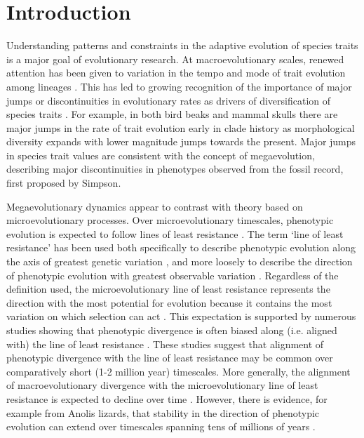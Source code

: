 \documentclass[12pt,letterpaper]{article}
\begin{document}
\section{Introduction}

Understanding patterns and constraints in the adaptive evolution of species traits is a major goal of evolutionary research. At macroevolutionary scales, renewed attention has been given to variation in the tempo and mode of trait evolution among lineages \cite{venditti2011multiple, khabbazian2016fast, castiglione2018, hansen2022, larouche2022mosaic, pagel2022general, navalon2022environmental, basu2023tempo}.
This has led to growing recognition of the importance of major jumps or discontinuities in evolutionary rates as drivers of diversification of species traits \cite{cooney2017mega, smaers2021evolution, goswami2022}.
For example, in both bird beaks and mammal skulls there are major jumps in the rate of trait evolution early in clade history as morphological diversity expands \cite{cooney2017mega, goswami2022} with lower magnitude jumps towards the present.
Major jumps in species trait values are consistent with the concept of megaevolution, describing major discontinuities in phenotypes observed from the fossil record, first proposed by Simpson.

Megaevolutionary dynamics appear to contrast with theory based on microevolutionary processes.
Over microevolutionary timescales, phenotypic evolution is expected to follow lines of least resistance \cite{schluter1996adaptive}.
The term ‘line of least resistance’ has been used both specifically to describe phenotypic evolution along the axis of greatest genetic variation \cite{schluter1996adaptive}, and more loosely to describe the direction of phenotypic evolution with greatest observable variation \cite{marroig2005size}.
Regardless of the definition used, the microevolutionary line of least resistance represents the direction with the most potential for evolution because it contains the most variation on which selection can act \cite{hansen2016, Rhoda2022, jablonski2022evolvability}.
This expectation is supported by numerous studies showing that phenotypic divergence is often biased along (i.e. aligned with) the line of least resistance \cite{marroig2005size, bolstad2014, walter2018, mcglothlin2018adaptive, tsuboi2018, Rhoda2022, mongle2022}.
These studies suggest that alignment of phenotypic divergence with the line of least resistance may be common over comparatively short (1-2 million year) timescales.
More generally, the alignment of macroevolutionary divergence with the microevolutionary line of least resistance is expected to decline over time \cite{mcglothlin2018adaptive}.
However, there is evidence, for example from Anolis lizards, that stability in the direction of phenotypic evolution can extend over timescales spanning tens of millions of years \cite{mcglothlin2018adaptive}.
\end{document}
